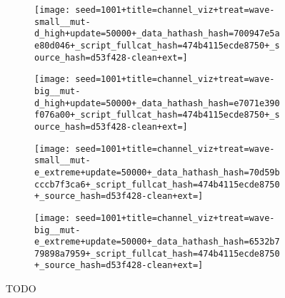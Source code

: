 \begin{figure}[!htbp]
\begin{center}
\begin{subfigure}[b]{0.45\columnwidth}
  \texttt{[image: seed=1001+title=channel\_viz+treat=wave-small\_\_mut-d\_high+update=50000+\_data\_hathash\_hash=700947e5ae80d046+\_script\_fullcat\_hash=474b4115ecde8750+\_source\_hash=d53f428-clean+ext=]}
\end{subfigure}
\begin{subfigure}[b]{0.45\columnwidth}
  \texttt{[image: seed=1001+title=channel\_viz+treat=wave-big\_\_mut-d\_high+update=50000+\_data\_hathash\_hash=e7071e390f076a00+\_script\_fullcat\_hash=474b4115ecde8750+\_source\_hash=d53f428-clean+ext=]}
\end{subfigure}

\begin{subfigure}[b]{0.45\columnwidth}
  \texttt{[image: seed=1001+title=channel\_viz+treat=wave-small\_\_mut-e\_extreme+update=50000+\_data\_hathash\_hash=70d59bcccb7f3ca6+\_script\_fullcat\_hash=474b4115ecde8750+\_source\_hash=d53f428-clean+ext=]}
\end{subfigure}
\begin{subfigure}[b]{0.45\columnwidth}
  \texttt{[image: seed=1001+title=channel\_viz+treat=wave-big\_\_mut-e\_extreme+update=50000+\_data\_hathash\_hash=6532b779898a7959+\_script\_fullcat\_hash=474b4115ecde8750+\_source\_hash=d53f428-clean+ext=]}
\end{subfigure}
\caption{
TODO
}
\label{fig:outcome_grids}
\end{center}
\end{figure}
